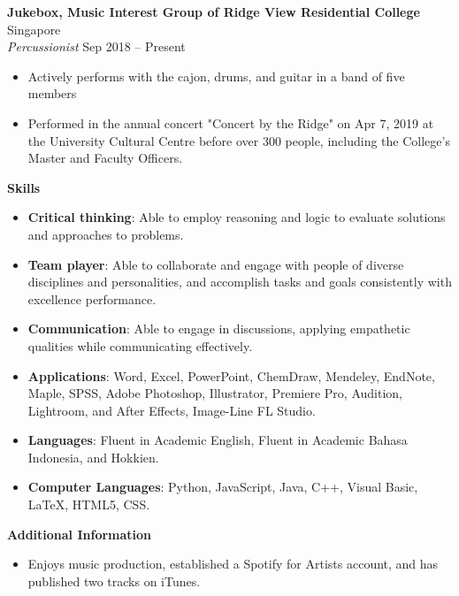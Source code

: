 \documentclass[a4paper, 11pt]{article}
\newcommand{\interspace}{\vspace{10pt}}
\begin{document}
	\textbf{Jukebox, Music Interest Group of Ridge View Residential College} \hfill Singapore\\
	\textit{Percussionist} \hfill Sep 2018 -- Present
	\begin{itemize}[leftmargin=*, noitemsep, topsep=0pt]
		\item Actively performs with the cajon, drums, and guitar in a band of five members
		\item Performed in the annual concert "Concert by the Ridge" on Apr 7, 2019 at the University Cultural Centre before over 300 people, including the College’s Master and Faculty Officers.
	\end{itemize}

	\interspace
	
	\textbf{\large Skills} \hrulefill
	\begin{itemize}[leftmargin=*, noitemsep, topsep=0pt]
		\item \textbf{Critical thinking}: Able to employ reasoning and logic to evaluate solutions and approaches to problems.
		\item \textbf{Team player}: Able to collaborate and engage with people of diverse disciplines and personalities, and accomplish tasks and goals consistently with excellence performance.
		\item \textbf{Communication}: Able to engage in discussions, applying empathetic qualities while communicating effectively.
		\item \textbf{Applications}: Word, Excel, PowerPoint, ChemDraw, Mendeley, EndNote, Maple, SPSS, Adobe Photoshop, Illustrator, Premiere Pro, Audition, Lightroom, and After Effects, Image-Line FL Studio.
		\item \textbf{Languages}: Fluent in Academic English, Fluent in Academic Bahasa Indonesia, and Hokkien.
		\item \textbf{Computer Languages}: Python, JavaScript, Java, C++, Visual Basic, \LaTeX, HTML5, CSS.
	\end{itemize}

	\interspace
	
	\textbf{\large Additional Information} \hrulefill
	\begin{itemize}[leftmargin=*, noitemsep, topsep=0pt]
		\item Enjoys music production, established a Spotify for Artists account, and has published two tracks on iTunes.
	\end{itemize}
\end{document}
